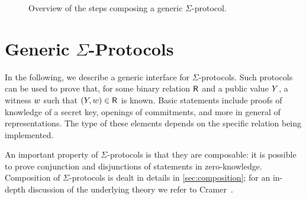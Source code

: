 \documentclass[11pt]{article}
\begin{document}
\begin{figure}[t]
  \begin{tcolorbox}
    \centering
  \end{tcolorbox}
  \caption{Overview of the steps composing a generic $\Sigma$-protocol.}
\end{figure}

\section{Generic $\Sigma$-Protocols}
In the following, we describe a generic interface for $\Sigma$-protocols.
Such protocols can be used to prove that, for some binary relation ${\mathsf{R}_{\operatorname{{}}}}$ and a public value $Y$, a witness $w$ such that $(Y,w)\in{\mathsf{R}_{\operatorname{{}}}}$ is known.
Basic statements include proofs of knowledge of a secret key, openings of commitments, and more in general of representations.
The type of these elements depends on the specific relation being implemented.

An important property of $\Sigma$-protocols is that they are composable: it is possible to prove conjunction and disjunctions of statements in zero-knowledge.
Composition of $\Sigma$-protocols is dealt in details in \cref{sec:composition}; for an in-depth discussion of the underlying theory we refer to Cramer~\cite{cramer97}.
\end{document}
